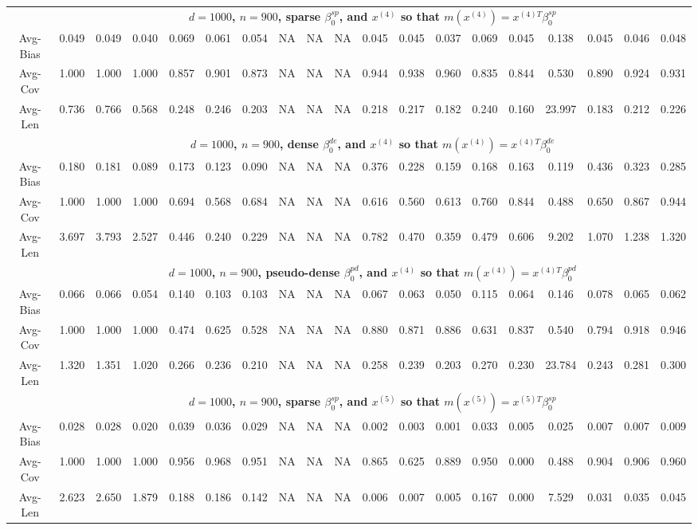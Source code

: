 \documentclass[ejsv2,noshowframe]{imsart}
\theoremstyle{plain}
\theoremstyle{definition}
\theoremstyle{remark}
\begin{document}
\begin{table}[hbtp!]
\begin{center}
{\begin{tabular}{ccccccccccccccccccc}
			& \multicolumn{18}{c}{\bf $d=1000$, $n = 900$, sparse $\beta_0^{sp}$, and $x^{(4)}$ so that $m(x^{(4)})=x^{(4)T}\beta_0^{sp}$} \\ \cline{2-19}
			Avg-Bias & 0.049 & 0.049 & 0.040 & 0.069 & 0.061 & 0.054 & NA & NA & NA & 0.045 & 0.045 & 0.037 & 0.069 & 0.045 & 0.138 & 0.045 & 0.046 & 0.048 \\
			Avg-Cov & 1.000 & 1.000 & 1.000 & 0.857 & 0.901 & 0.873 & NA & NA & NA & 0.944 & 0.938 & 0.960 & 0.835 & 0.844 & 0.530 & 0.890 & 0.924 & 0.931 \\
			Avg-Len & 0.736 & 0.766 & 0.568 & 0.248 & 0.246 & 0.203 & NA & NA & NA & 0.218 & 0.217 & 0.182 & 0.240 & 0.160 & 23.997 & 0.183 & 0.212 & 0.226 \\
			\cline{2-19}
			& \multicolumn{18}{c}{\bf $d=1000$, $n = 900$, dense $\beta_0^{de}$, and $x^{(4)}$ so that $m(x^{(4)})=x^{(4)T}\beta_0^{de}$} \\ \cline{2-19}
			Avg-Bias & 0.180 & 0.181 & 0.089 & 0.173 & 0.123 & 0.090 & NA & NA & NA & 0.376 & 0.228 & 0.159 & 0.168 & 0.163 & 0.119 & 0.436 & 0.323 & 0.285 \\
			Avg-Cov & 1.000 & 1.000 & 1.000 & 0.694 & 0.568 & 0.684 & NA & NA & NA & 0.616 & 0.560 & 0.613 & 0.760 & 0.844 & 0.488 & 0.650 & 0.867 & 0.944 \\
			Avg-Len & 3.697 & 3.793 & 2.527 & 0.446 & 0.240 & 0.229 & NA & NA & NA & 0.782 & 0.470 & 0.359 & 0.479 & 0.606 & 9.202 & 1.070 & 1.238 & 1.320 \\
			\cline{2-19}
			& \multicolumn{18}{c}{\bf $d=1000$, $n = 900$, pseudo-dense $\beta_0^{pd}$, and $x^{(4)}$ so that $m(x^{(4)})=x^{(4)T}\beta_0^{pd}$} \\ \cline{2-19}
			Avg-Bias & 0.066 & 0.066 & 0.054 & 0.140 & 0.103 & 0.103 & NA & NA & NA & 0.067 & 0.063 & 0.050 & 0.115 & 0.064 & 0.146 & 0.078 & 0.065 & 0.062 \\
			Avg-Cov & 1.000 & 1.000 & 1.000 & 0.474 & 0.625 & 0.528 & NA & NA & NA & 0.880 & 0.871 & 0.886 & 0.631 & 0.837 & 0.540 & 0.794 & 0.918 & 0.946 \\
			Avg-Len & 1.320 & 1.351 & 1.020 & 0.266 & 0.236 & 0.210 & NA & NA & NA & 0.258 & 0.239 & 0.203 & 0.270 & 0.230 & 23.784 & 0.243 & 0.281 & 0.300 \\
			\hline
			
			& \multicolumn{18}{c}{\bf $d=1000$, $n = 900$, sparse $\beta_0^{sp}$, and $x^{(5)}$ so that $m(x^{(5)})=x^{(5)T}\beta_0^{sp}$} \\ \cline{2-19}
			Avg-Bias & 0.028 & 0.028 & 0.020 & 0.039 & 0.036 & 0.029 & NA & NA & NA & 0.002 & 0.003 & 0.001 & 0.033 & 0.005 & 0.025 & 0.007 & 0.007 & 0.009 \\
			Avg-Cov & 1.000 & 1.000 & 1.000 & 0.956 & 0.968 & 0.951 & NA & NA & NA & 0.865 & 0.625 & 0.889 & 0.950 & 0.000 & 0.488 & 0.904 & 0.906 & 0.960 \\
			Avg-Len & 2.623 & 2.650 & 1.879 & 0.188 & 0.186 & 0.142 & NA & NA & NA & 0.006 & 0.007 & 0.005 & 0.167 & 0.000 & 7.529 & 0.031 & 0.035 & 0.045 \\
			

\end{tabular}}
\end{center}
\end{table}
\end{document}

